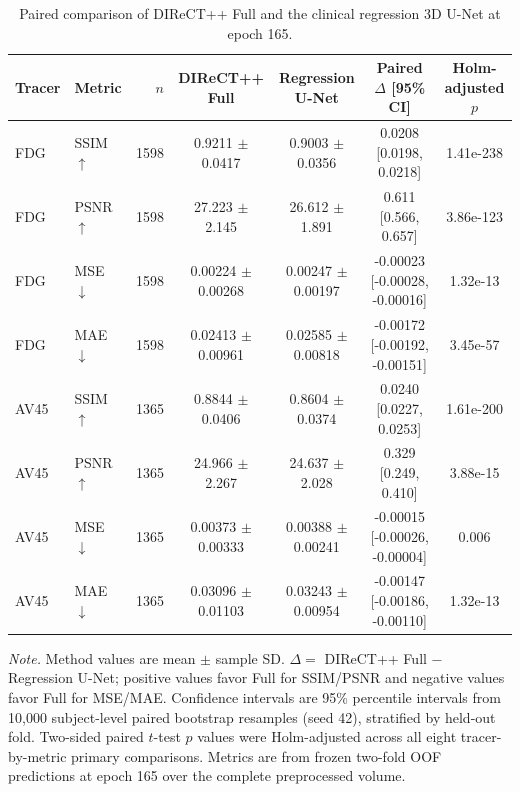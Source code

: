 \begin{table}[t]
\centering
\caption{Paired comparison of DIReCT++ Full and the clinical regression 3D U-Net at epoch 165.}
\label{tab:clinical-regression-e165}
\small
\setlength{\tabcolsep}{4pt}
\begin{tabular}{llrcccc}
\toprule
Tracer & Metric & $n$ & DIReCT++ Full & Regression U-Net & Paired $\Delta$ [95\% CI] & Holm-adjusted $p$ \\
\midrule
FDG & SSIM $\uparrow$ & 1598 & 0.9211 $\pm$ 0.0417 & 0.9003 $\pm$ 0.0356 & 0.0208 [0.0198, 0.0218] & 1.41e-238 \\
FDG & PSNR $\uparrow$ & 1598 & 27.223 $\pm$ 2.145 & 26.612 $\pm$ 1.891 & 0.611 [0.566, 0.657] & 3.86e-123 \\
FDG & MSE $\downarrow$ & 1598 & 0.00224 $\pm$ 0.00268 & 0.00247 $\pm$ 0.00197 & -0.00023 [-0.00028, -0.00016] & 1.32e-13 \\
FDG & MAE $\downarrow$ & 1598 & 0.02413 $\pm$ 0.00961 & 0.02585 $\pm$ 0.00818 & -0.00172 [-0.00192, -0.00151] & 3.45e-57 \\
AV45 & SSIM $\uparrow$ & 1365 & 0.8844 $\pm$ 0.0406 & 0.8604 $\pm$ 0.0374 & 0.0240 [0.0227, 0.0253] & 1.61e-200 \\
AV45 & PSNR $\uparrow$ & 1365 & 24.966 $\pm$ 2.267 & 24.637 $\pm$ 2.028 & 0.329 [0.249, 0.410] & 3.88e-15 \\
AV45 & MSE $\downarrow$ & 1365 & 0.00373 $\pm$ 0.00333 & 0.00388 $\pm$ 0.00241 & -0.00015 [-0.00026, -0.00004] & 0.006 \\
AV45 & MAE $\downarrow$ & 1365 & 0.03096 $\pm$ 0.01103 & 0.03243 $\pm$ 0.00954 & -0.00147 [-0.00186, -0.00110] & 1.32e-13 \\
\bottomrule
\end{tabular}
\begin{minipage}{0.99\textwidth}
\footnotesize
\textit{Note.} Method values are mean $\pm$ sample SD. $\Delta=$ DIReCT++ Full $-$ Regression U-Net; positive values favor Full for SSIM/PSNR and negative values favor Full for MSE/MAE. Confidence intervals are 95\% percentile intervals from 10{,}000 subject-level paired bootstrap resamples (seed 42), stratified by held-out fold. Two-sided paired $t$-test $p$ values were Holm-adjusted across all eight tracer-by-metric primary comparisons. Metrics are from frozen two-fold OOF predictions at epoch 165 over the complete preprocessed volume.
\end{minipage}
\end{table}
